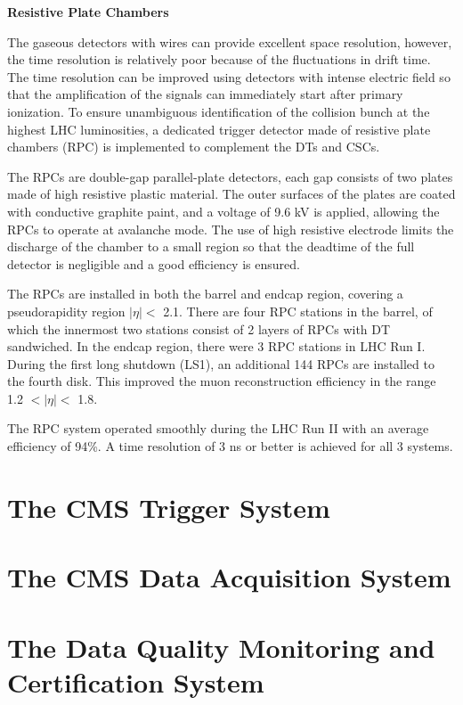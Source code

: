 \documentclass[thesis.tex]{subfiles}
\begin{document}
\noindent \textbf{Resistive Plate Chambers}

The gaseous detectors with wires can provide excellent space resolution, however, the time resolution is relatively poor because of the fluctuations in drift time. 
The time resolution can be improved using detectors with intense electric field so that the amplification of the signals can immediately start after primary ionization. 
To ensure unambiguous identification of the collision bunch at the highest LHC luminosities, a dedicated trigger detector made of resistive plate chambers (RPC) is implemented to complement the DTs and CSCs.

The RPCs are double-gap parallel-plate detectors, each gap consists of two plates made of high resistive plastic material. 
The outer surfaces of the plates are coated with conductive graphite paint, and a voltage of 9.6 kV is applied, allowing the RPCs to operate at avalanche mode.
The use of high resistive electrode limits the discharge of the chamber to a small region so that the deadtime of the full detector is negligible and a good efficiency is ensured.

The RPCs are installed in both the barrel and endcap region, covering a pseudorapidity region $|\eta| <$ 2.1.
There are four RPC stations in the barrel, of which the innermost two stations consist of 2 layers of RPCs with DT sandwiched. 
In the endcap region, there were 3 RPC stations in LHC Run I. 
During the first long shutdown (LS1), an additional 144 RPCs are installed to the fourth disk. This improved the muon reconstruction efficiency in the range 1.2 $< |\eta| < $ 1.8. 

The RPC system operated smoothly during the LHC Run II with an average efficiency of 94\%. 
A time resolution of 3 ns or better is achieved for all 3 systems.


\section{The CMS Trigger System}

\section{The CMS Data Acquisition System}

\section{The Data Quality Monitoring and Certification System}
\end{document}

